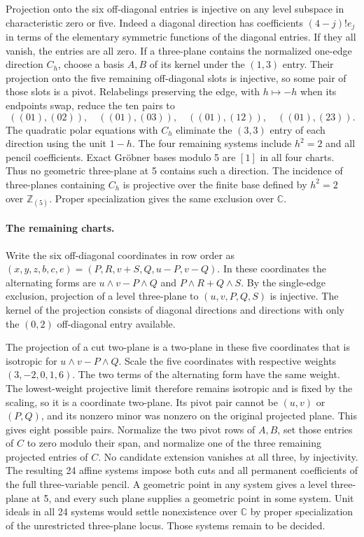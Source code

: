 Projection onto the six off-diagonal entries is injective on any
level subspace in characteristic zero or five. Indeed a diagonal
direction has coefficients \((4-j)!e_j\) in terms of the elementary
symmetric functions of the diagonal entries. If they all vanish,
the entries are all zero. If a three-plane contains the normalized
one-edge direction \(C_h\), choose a basis \(A,B\) of its kernel
under the \((1,3)\) entry. Their projection onto the five remaining
off-diagonal slots is injective, so some pair of those slots is
a pivot. Relabelings preserving the edge, with \(h\mapsto-h\) when
its endpoints swap, reduce the ten pairs to
\[
 ((01),(02)),\quad ((01),(03)),\quad ((01),(12)),\quad ((01),(23)).
\]
The quadratic polar equations with \(C_h\) eliminate the \((3,3)\)
entry of each direction using the unit \(1-h\). The four remaining
systems include \(h^2=2\) and all pencil coefficients. Exact
Gr\"obner bases modulo 5 are \([1]\) in all four charts. Thus no
geometric three-plane at 5 contains such a direction. The incidence
of three-planes containing \(C_h\) is projective over the finite
base defined by \(h^2=2\) over \(\mathbb Z_{(5)}\). Proper
specialization gives the same exclusion over \(\mathbb C\).

\paragraph{The remaining charts.}
Write the six off-diagonal coordinates in row order as
\((x,y,z,b,c,e)=(P,R,v+S,Q,u-P,v-Q)\). In these coordinates the
alternating forms are \(u\wedge v-P\wedge Q\) and
\(P\wedge R+Q\wedge S\). By the single-edge exclusion, projection
of a level three-plane to \((u,v,P,Q,S)\) is injective. The kernel
of the projection consists of diagonal directions and directions
with only the \((0,2)\) off-diagonal entry available.

The projection of a cut two-plane is a two-plane in these five
coordinates that is isotropic for \(u\wedge v-P\wedge Q\). Scale
the five coordinates with respective weights \((3,-2,0,1,6)\).
The two terms of the alternating form have the same weight.
The lowest-weight projective limit therefore remains isotropic
and is fixed by the scaling, so it is a coordinate two-plane.
Its pivot pair cannot be \((u,v)\) or \((P,Q)\), and its nonzero
minor was nonzero on the original projected plane. This gives
eight possible pairs. Normalize the two pivot rows of \(A,B\),
set those entries of \(C\) to zero modulo their span, and
normalize one of the three remaining projected entries of
\(C\). No candidate extension vanishes at all three, by injectivity.
The resulting 24 affine systems impose both cuts and all
permanent coefficients of the full three-variable pencil.
A geometric point in any system gives a level three-plane at 5,
and every such plane supplies a geometric point in some system.
Unit ideals in all 24 systems would settle nonexistence over
\(\mathbb C\) by proper specialization of the unrestricted
three-plane locus. Those systems remain to be decided.

